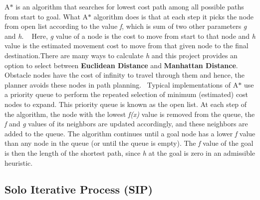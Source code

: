 A$\ast$ is an algorithm that searches for lowest cost path among all possible paths from start to goal. What A$\ast$ algorithm does is that at each step it picks the node from open list according to the value {\itshape f}, which is sum of two other parameters {\itshape g} and {\itshape h}. ~\newline
 Here, {\itshape g} value of a node is the cost to move from start to that node and {\itshape h} value is the estimated movement cost to move from that given node to the final destination.\+There are many ways to calculate {\itshape h} and this project provides an option to select between {\bfseries Euclidean Distance} and {\bfseries Manhattan Distance}.~\newline
 Obstacle nodes have the cost of infinity to travel through them and hence, the planner avoids these nodes in path planning.~\newline
 Typical implementations of A$\ast$ use a priority queue to perform the repeated selection of minimum (estimated) cost nodes to expand. This priority queue is known as the open list. At each step of the algorithm, the node with the lowest {\itshape f(x)} value is removed from the queue, the {\itshape f} and {\itshape g} values of its neighbors are updated accordingly, and these neighbors are added to the queue. The algorithm continues until a goal node has a lower {\itshape f} value than any node in the queue (or until the queue is empty). The {\itshape f} value of the goal is then the length of the shortest path, since {\itshape h} at the goal is zero in an admissible heuristic.

\subsection*{Solo Iterative Process (S\+IP)}


